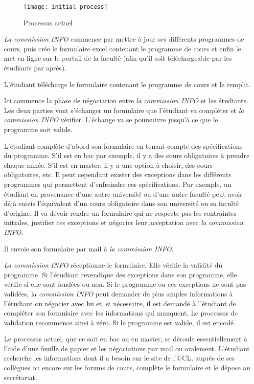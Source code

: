 \begin{figure}
\centering
\caption{Processus actuel}
\texttt{[image: initial\_process]}
\label{fig:initial_process}
\end{figure} 

\textit{La commission INFO} commence par mettre à jour ses différents programmes de cours, puis crée le formulaire excel contenant le programme de cours et enfin le met en ligne sur le portail de la faculté (afin qu'il soit téléchargeable par les étudiants par après).

L'étudiant télécharge le formulaire contenant le programme de cours et le remplit. 

Ici commence la phase de négociation entre \textit{la commission INFO} et les étudiants. Les deux parties vont s'échanger un formulaire que l'étudiant va compléter et \textit{la commission INFO} vérifier. L'échange va se poursuivre jusqu'à ce que le programme soit valide. 

L'étudiant complète d'abord son formulaire en tenant compte des spécifications du programme. S'il est en bac par exemple, il y a des cours obligatoires à prendre chaque année. S'il est en master, il y a une option à choisir, des cours obligatoires, etc. Il peut cependant exister des exceptions dans les différents programmes qui permettent d'enfreindre ces spécifications. Par exemple, un étudiant en provenance d'une autre université ou d'une autre faculté peut avoir déjà suivis l'équivalent d'un cours obligatoire dans son université ou sa faculté d'origine. Il va devoir rendre un formulaire qui ne respecte pas les contraintes initiales, justifier ces exceptions et négocier leur acceptation avec \textit{la commission INFO}.

Il envoie son formulaire par mail à \textit{la commission INFO}.

\textit{La commission INFO} réceptionne le formulaire. Elle vérifie la validité du programme. Si l'étudiant revendique des exceptions dans son programme, elle vérifie si elle sont fondées ou non. Si le programme ou ces exceptions ne sont pas validées, la \textit{commission INFO} peut demander de plus amples informations à l'étudiant ou négocier avec lui et, si nécessaire, il est demandé à l'étudiant de compléter son formulaire avec les informations qui manquent. Le processus de validation recommence ainsi à zéro. Si le programme est valide, il est encodé. 

Le processus actuel, que ce soit en bac ou en master, se déroule essentiellement à l'aide d'une feuille de papier et les négociations par mail ou oralement. L'étudiant recherche les informations dont il a besoin sur le site de l'UCL, auprès de ses collègues ou encore sur les forums de cours, complète le formulaire et le dépose au secrétariat.

